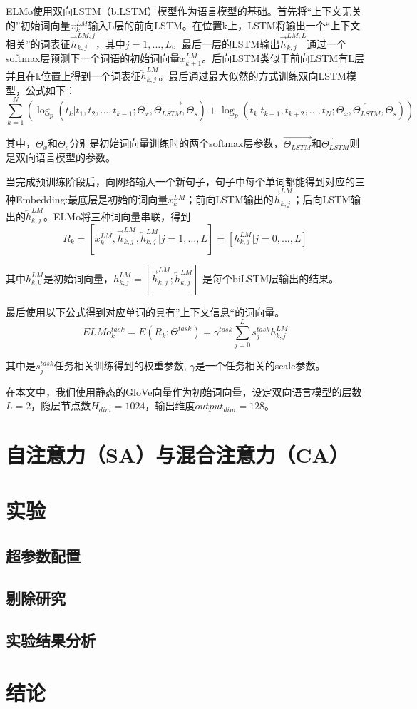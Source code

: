 ELMo使用双向LSTM（biLSTM）模型作为语言模型的基础。首先将“上下文无关的”初始词向量$x{_k^{LM}}$输入L层的前向LSTM。在位置k上，LSTM将输出一个“上下文相关”的词表征$\vec{h}_{k,j}^{LM,j}$，其中$j = 1, ..., L$。最后一层的LSTM输出$\vec{h}_{k,j}^{LM,L}$通过一个softmax层预测下一个词语的初始词向量$x{_{k+1}^{LM}}$。后向LSTM类似于前向LSTM有L层并且在k位置上得到一个词表征$\overleftarrow{h}_{k,j}^{LM}$。最后通过最大似然的方式训练双向LSTM模型，公式如下：
\begin{equation}
\sum_{k=1}^N(\log_p(t_k|t_1, t_2,..., t_{k-1};\Theta_x,\overrightarrow{\Theta_{LSTM}},\Theta_s) + \log_p(t_k|t_{k+1},t_{k+2},...,t_N;\Theta_x,\overleftarrow{\Theta_{LSTM}},\Theta_s)
)
\end{equation}

其中，$\Theta_x$和$\Theta_s$分别是初始词向量训练时的两个softmax层参数，$\overrightarrow{\Theta_{LSTM}}$和$\overleftarrow{\Theta_{LSTM}}$则是双向语言模型的参数。

当完成预训练阶段后，向网络输入一个新句子，句子中每个单词都能得到对应的三种Embedding:最底层是初始的词向量$x{_k^{LM}}$；前向LSTM输出的$\overrightarrow{h}_{k,j}^{LM}$；后向LSTM输出的$\overleftarrow{h}_{k,j}^{LM}$。ELMo将三种词向量串联，得到
\begin{equation}
R_k = 
[x_k^{LM}, \overrightarrow{h}_{k,j}^{LM}, \overleftarrow{h}_{k,j}^{LM} | j = 1, ..., L]
= [h_{k,j}^{LM} | j = 0, ..., L]
\end{equation}

其中$h_{k,0}^{LM}$是初始词向量，$h_{k,j}^{LM} = [\overrightarrow{h}_{k,j}^{LM}; \overleftarrow{h}_{k,j}^{LM}]$ 是每个biLSTM层输出的结果。

最后使用以下公式得到对应单词的具有”上下文信息“的词向量。
\begin{equation}
ELMo_k^{task} = E(R_k; \Theta^{task}) = \gamma^{task}\sum_{j=0}^L s_j^{task} h_{k,j}^{LM}
\end{equation}

其中是$s_j^{task}$任务相关训练得到的权重参数, $\gamma$是一个任务相关的scale参数。

在本文中，我们使用静态的GloVe向量作为初始词向量，设定双向语言模型的层数$L = 2$，隐层节点数$H_{dim} = 1024$，输出维度$output_{dim} = 128$。

\section{自注意力（SA）与混合注意力（CA）}

\section{实验}
\subsection{超参数配置}
\subsection{剔除研究}
\subsection{实验结果分析}

\section{结论}

